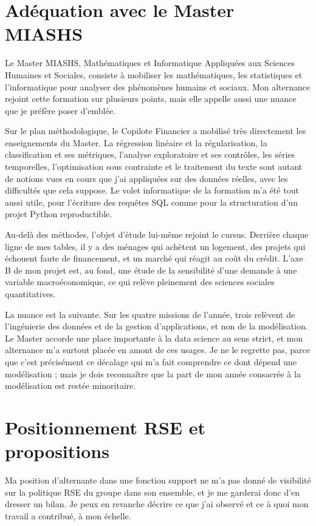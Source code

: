 \section{Adéquation avec le Master MIASHS}

Le Master MIASHS, Mathématiques et Informatique Appliquées aux Sciences Humaines et Sociales,
consiste à mobiliser les mathématiques, les statistiques et l'informatique pour analyser des
phénomènes humains et sociaux. Mon alternance rejoint cette formation sur plusieurs points, mais
elle appelle aussi une nuance que je préfère poser d'emblée.

Sur le plan méthodologique, le Copilote Financier a mobilisé très directement les enseignements
du Master. La régression linéaire et la régularisation, la classification et ses métriques,
l'analyse exploratoire et ses contrôles, les séries temporelles, l'optimisation sous contrainte
et le traitement du texte sont autant de notions vues en cours que j'ai appliquées sur des
données réelles, avec les difficultés que cela suppose. Le volet informatique de la formation
m'a été tout aussi utile, pour l'écriture des requêtes SQL comme pour la structuration d'un
projet Python reproductible.

Au-delà des méthodes, l'objet d'étude lui-même rejoint le cursus. Derrière chaque ligne de mes
tables, il y a des ménages qui achètent un logement, des projets qui échouent faute de
financement, et un marché qui réagit au coût du crédit. L'axe B de mon projet est, au fond, une
étude de la sensibilité d'une demande à une variable macroéconomique, ce qui relève pleinement
des sciences sociales quantitatives.

La nuance est la suivante. Sur les quatre missions de l'année, trois relèvent de l'ingénierie
des données et de la gestion d'applications, et non de la modélisation. Le Master accorde une
place importante à la data science au sens strict, et mon alternance m'a surtout placée en
amont de ces usages. Je ne le regrette pas, parce que c'est précisément ce décalage qui m'a fait
comprendre ce dont dépend une modélisation ; mais je dois reconnaître que la part de mon année
consacrée à la modélisation est restée minoritaire.

\section{Positionnement RSE et propositions}

Ma position d'alternante dans une fonction support ne m'a pas donné de visibilité sur la
politique RSE du groupe dans son ensemble, et je me garderai donc d'en dresser un bilan. Je peux
en revanche décrire ce que j'ai observé et ce à quoi mon travail a contribué, à mon échelle.

